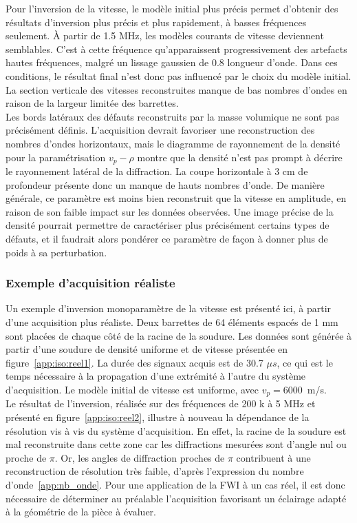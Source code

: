 Pour l'inversion de la vitesse, le modèle initial plus précis permet d'obtenir des résultats d'inversion plus précis et plus rapidement, à basses fréquences seulement. À partir de 1.5 MHz, les modèles courants de vitesse deviennent semblables. C'est à cette fréquence qu'apparaissent progressivement  des artefacts hautes fréquences, malgré un lissage gaussien de 0.8 longueur d'onde. Dans ces conditions, le résultat final n'est donc pas influencé par le choix du modèle initial. La section verticale des vitesses reconstruites manque de bas nombres d'ondes en raison de la largeur limitée des barrettes.\\


Les bords latéraux des défauts reconstruits par la masse volumique ne sont pas précisément définis. L'acquisition devrait favoriser une reconstruction des nombres d'ondes horizontaux, mais le diagramme de rayonnement de la densité pour la paramétrisation $v_{p}-\rho$ montre que la densité n'est pas prompt à décrire le rayonnement latéral de la diffraction. La coupe horizontale à 3 cm de profondeur présente donc un manque de hauts nombres d'onde. De manière générale, ce paramètre est moins bien reconstruit que la vitesse en amplitude, en raison de son faible impact sur les données observées. Une image précise de la densité pourrait permettre de caractériser plus précisément certains types de défauts, et il faudrait alors pondérer ce paramètre de façon à donner plus de poids à sa perturbation.\\


\subsubsection{Exemple d'acquisition réaliste}
Un exemple d'inversion monoparamètre de la vitesse est présenté ici, à partir d'une acquisition plus réaliste. Deux barrettes de 64 éléments espacés de 1 mm sont placées de chaque côté de la racine de la soudure. Les données sont générée à partir d'une soudure de densité uniforme et de vitesse présentée en figure~\ref{app:iso:reel1}. La durée des signaux acquis est de 30.7 $\mu s$, ce qui est le temps nécessaire à la propagation d'une extrémité à l'autre du système d'acquisition. Le modèle initial de vitesse est uniforme, avec $v_{p}=6000$~m/s.\\

 Le résultat de l'inversion, réalisée sur des fréquences de 200 k à 5 MHz et présenté en figure~\ref{app:iso:reel2}, illustre à nouveau la dépendance de la résolution vis à vis du système d'acquisition. En effet, la racine de la soudure est mal reconstruite dans cette zone car les diffractions mesurées sont d'angle nul ou proche de $\pi$. Or, les angles de diffraction proches de $\pi$  contribuent à une reconstruction de résolution très faible, d'après l'expression du nombre d'onde~\ref{app:nb_onde}. Pour une application de la FWI à un cas réel, il est donc nécessaire de déterminer au préalable l'acquisition favorisant un éclairage adapté à la géométrie de la pièce à évaluer.
 
